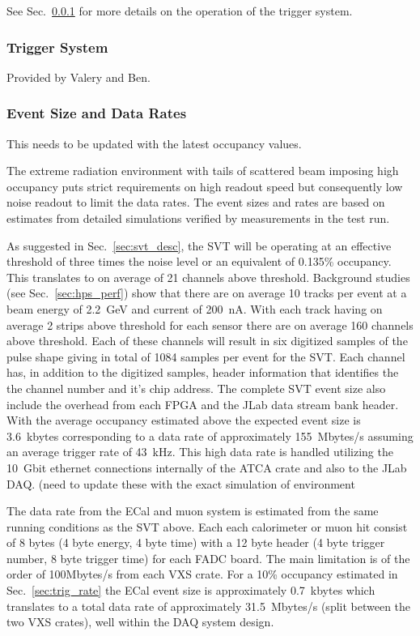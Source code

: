 See Sec.~\ref{sec:triggerdaq} for more details on the operation of the trigger system.


\subsubsection{Trigger System}
\label{sec:triggerdaq}
Provided by Valery and Ben.

\subsubsection{Event Size and Data Rates}

{\color{red}This needs to be updated with the latest occupancy values.}

The extreme radiation environment with tails of scattered beam imposing high occupancy
 puts strict requirements on high readout speed but consequently low noise readout to limit 
 the data rates. The event sizes and rates are based on estimates from detailed simulations 
 verified by measurements in the test run. 
  
As suggested in Sec.~\ref{sec:svt_desc}, the SVT will be operating at an effective threshold of three
times the noise level or an equivalent of 0.135\% occupancy. This translates to on average of 21 channels above threshold. Background studies (see Sec.~\ref{sec:hps_perf}) show that 
there are on average 10 tracks per event at a beam energy of 2.2~GeV and current of 
200~nA. With each track 
having on average 2 strips above threshold for each sensor there are on average 160 channels above threshold. Each of these channels will result in six digitized samples of the 
pulse shape giving in total of 1084 samples per event for the SVT.
Each channel has, in addition to the digitized samples,  header information that identifies the 
the channel number and it's chip address. The complete SVT event size also 
include the overhead from each FPGA and the JLab data stream bank header.  
With the average occupancy 
estimated above the expected event size is 3.6~kbytes corresponding to a data rate of 
approximately 155~Mbytes/s assuming an average trigger rate of 43~kHz.  
This high data rate is handled utilizing 
the 10~Gbit ethernet connections internally of the ATCA crate and also to the JLab DAQ.
{\color{red} (need to update these with the exact simulation of environment}


The data rate from the ECal and muon system is estimated from the same running 
conditions as the SVT above. 
Each each calorimeter or muon hit consist of 8 bytes (4 byte energy, 4 byte time)
 with a 12 byte header (4 byte trigger number, 8 byte trigger time) for each FADC board. 
 The main limitation is of the order of 100Mbytes/s from each VXS crate. For a 
 10\% occupancy estimated in Sec.~\ref{sec:trig_rate} the ECal event size is approximately 0.7~kbytes which translates to a total data rate of approximately 31.5~Mbytes/s 
(split between the two VXS crates), well within the DAQ system design. 

